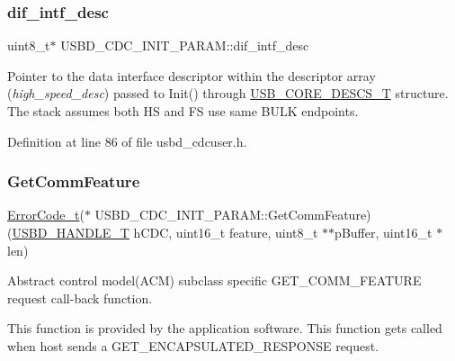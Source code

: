 \subsubsection{\texorpdfstring{dif\+\_\+intf\+\_\+desc}{dif\_intf\_desc}}
{\footnotesize\ttfamily uint8\+\_\+t$\ast$ U\+S\+B\+D\+\_\+\+C\+D\+C\+\_\+\+I\+N\+I\+T\+\_\+\+P\+A\+R\+A\+M\+::dif\+\_\+intf\+\_\+desc}

Pointer to the data interface descriptor within the descriptor array ({\itshape high\+\_\+speed\+\_\+desc}) passed to Init() through \hyperlink{group___u_s_b_d___core_gabdc617d119eac0555f91bea957c41ecc}{U\+S\+B\+\_\+\+C\+O\+R\+E\+\_\+\+D\+E\+S\+C\+S\+\_\+T} structure. The stack assumes both HS and FS use same B\+U\+LK endpoints. 

Definition at line 86 of file usbd\+\_\+cdcuser.\+h.

\mbox{\label{struct_u_s_b_d___c_d_c___i_n_i_t___p_a_r_a_m_ab8edfef92cb0d830a742a68d96e10952}} 
\subsubsection{\texorpdfstring{Get\+Comm\+Feature}{GetCommFeature}}
{\footnotesize\ttfamily \hyperlink{error_8h_a905255056c349318139d94aa4523d516}{Error\+Code\+\_\+t}($\ast$ U\+S\+B\+D\+\_\+\+C\+D\+C\+\_\+\+I\+N\+I\+T\+\_\+\+P\+A\+R\+A\+M\+::\+Get\+Comm\+Feature) (\hyperlink{group___u_s_b_d___core_gafdbb2204d929cb9d75736bd2b42342ac}{U\+S\+B\+D\+\_\+\+H\+A\+N\+D\+L\+E\+\_\+T} h\+C\+DC, uint16\+\_\+t feature, uint8\+\_\+t $\ast$$\ast$p\+Buffer, uint16\+\_\+t $\ast$len)}

Abstract control model(\+A\+C\+M) subclass specific G\+E\+T\+\_\+\+C\+O\+M\+M\+\_\+\+F\+E\+A\+T\+U\+RE request call-\/back function.

This function is provided by the application software. This function gets called when host sends a G\+E\+T\+\_\+\+E\+N\+C\+A\+P\+S\+U\+L\+A\+T\+E\+D\+\_\+\+R\+E\+S\+P\+O\+N\+SE request.


